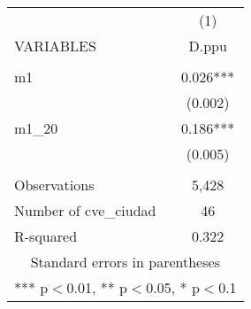 \begin{tabular}{lc} \hline
 & (1) \\
VARIABLES & D.ppu \\ \hline
 &  \\
m1 & 0.026*** \\
 & (0.002) \\
m1\_20 & 0.186*** \\
 & (0.005) \\
 &  \\
Observations & 5,428 \\
Number of cve\_ciudad & 46 \\
 R-squared & 0.322 \\ \hline
\multicolumn{2}{c}{ Standard errors in parentheses} \\
\multicolumn{2}{c}{ *** p$<$0.01, ** p$<$0.05, * p$<$0.1} \\
\end{tabular}
